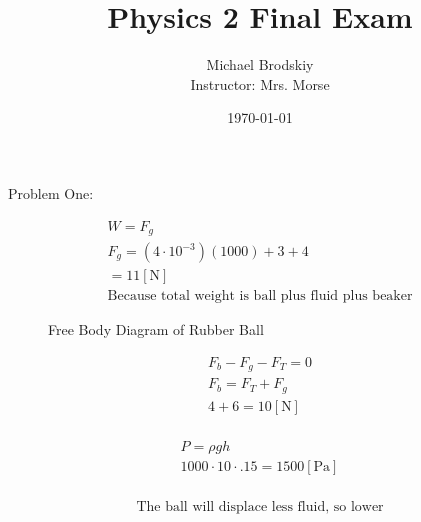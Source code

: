 \documentclass[12pt]{article}
\title{Physics 2 Final Exam}
\date{\today}
\author{Michael Brodskiy\\ \small Instructor: Mrs. Morse}
\begin{document}
\maketitle

\begin{center}
  Problem One:
\end{center}
    \hline

    \begin{equation}
      \begin{split}
        W=F_g\\
        F_g=(4\cdot10^{-3})(1000)+3+4\\
        =11[\si{\newton}]\\
        \text{Because total weight is ball plus fluid plus beaker}
      \end{split}
      \label{1}
    \end{equation}

    \begin{figure}[h]
      \centering
      
      \caption{Free Body Diagram of Rubber Ball}
      \label{fig:1}
    \end{figure}

    \begin{equation}
      \begin{split}
        F_b-F_g-F_T=0\\
        F_b=F_T+F_g\\
        4+6=10[\si{\newton}]\\
      \end{split}
      \label{2}
    \end{equation}

    \begin{equation}
      \begin{split}
        P=\rho g h\\
        1000\cdot10\cdot.15=1500[\si{\pascal}]\\
      \end{split}
      \label{3}
    \end{equation}

    \begin{equation}
      \begin{split}
        \text{The ball will displace less fluid, so lower}
      \end{split}
      \label{4}
    \end{equation}

    \hline

    \newpage
\end{document}
